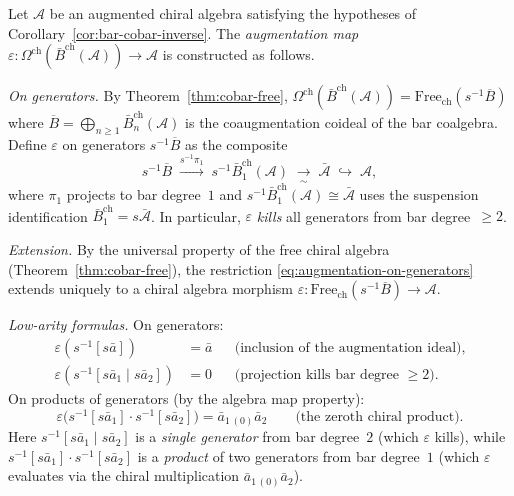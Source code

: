 \begin{proposition}
\label{prop:cobar-bar-augmentation}
Let $\mathcal{A}$ be an augmented chiral algebra satisfying the
hypotheses of Corollary~\ref{cor:bar-cobar-inverse}.
The \emph{augmentation map}
$\varepsilon\colon
\Omega^{\mathrm{ch}}(\bar{B}^{\mathrm{ch}}(\mathcal{A}))
\to \mathcal{A}$
is constructed as follows.

\emph{On generators.}
By Theorem~\ref{thm:cobar-free},
$\Omega^{\mathrm{ch}}(\bar{B}^{\mathrm{ch}}(\mathcal{A}))
= \mathrm{Free}_{\mathrm{ch}}(s^{-1}\overline{B})$
where $\overline{B} = \bigoplus_{n \geq 1}
\bar{B}^{\mathrm{ch}}_n(\mathcal{A})$ is the coaugmentation
coideal of the bar coalgebra.
Define $\varepsilon$ on generators $s^{-1}\overline{B}$ as the
composite
\begin{equation}\label{eq:augmentation-on-generators}
s^{-1}\overline{B}
\;\xrightarrow{s^{-1}\pi_1}\;
s^{-1}\bar{B}^{\mathrm{ch}}_1(\mathcal{A})
\;\xrightarrow[\sim]{}\;
\bar{\mathcal{A}}
\;\hookrightarrow\; \mathcal{A},
\end{equation}
where $\pi_1$ projects to bar degree~$1$ and
$s^{-1}\bar{B}^{\mathrm{ch}}_1(\mathcal{A})
\cong \bar{\mathcal{A}}$
uses the suspension identification
$\bar{B}^{\mathrm{ch}}_1 = s\bar{\mathcal{A}}$.
In particular, $\varepsilon$ \emph{kills} all generators from bar
degree~$\geq 2$.

\emph{Extension.}
By the universal property of the free chiral algebra
(Theorem~\ref{thm:cobar-free}), the restriction
\eqref{eq:augmentation-on-generators} extends uniquely to a
chiral algebra morphism
$\varepsilon\colon
\mathrm{Free}_{\mathrm{ch}}(s^{-1}\overline{B}) \to \mathcal{A}$.

\emph{Low-arity formulas.}
On generators:
\begin{align}
\varepsilon(s^{-1}[s\bar{a}]) &= \bar{a}
  &&\text{(inclusion of the augmentation ideal),}
  \label{eq:aug-arity-1} \\
\varepsilon(s^{-1}[s\bar{a}_1 \mid s\bar{a}_2]) &= 0
  &&\text{(projection kills bar degree $\geq 2$).}
  \label{eq:aug-arity-2-gen}
\end{align}
On products of generators (by the algebra map property):
\begin{equation}\label{eq:aug-product}
\varepsilon\bigl(s^{-1}[s\bar{a}_1]
  \cdot s^{-1}[s\bar{a}_2]\bigr)
= \bar{a}_{1\,(0)}\bar{a}_2
\qquad\text{(the zeroth chiral product).}
\end{equation}
Here $s^{-1}[s\bar{a}_1 \mid s\bar{a}_2]$ is a \emph{single
generator} from bar degree~$2$ (which $\varepsilon$ kills),
while $s^{-1}[s\bar{a}_1] \cdot s^{-1}[s\bar{a}_2]$ is a
\emph{product} of two generators from bar degree~$1$ (which
$\varepsilon$ evaluates via the chiral multiplication
$\bar{a}_{1\,(0)}\bar{a}_2$).
\end{proposition}

